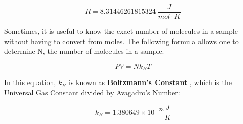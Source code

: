 	\begin{mdframed}[backgroundcolor=green!20!white]
	\begin{equation*}
		R = \SI{8.31446261815324}{\frac{J}{mol\cdot K}}
		\label{constant:universalgas}
	\end{equation*}
\end{mdframed}	


Sometimes, it is useful to know the exact number of molecules in a sample without having to convert from moles.  The following formula allows one to determine N, the number of molecules in a sample.
	
		\begin{mdframed}[backgroundcolor=orange!20!white]
		\begin{equation}
			PV = N k_BT
			\label{equation:universalgaslawkb}
		\end{equation}
	\end{mdframed}

In this equation, $k_B$ is known as \textbf{Boltzmann's Constant}  , which is the Universal Gas Constant divided by Avagadro's Number:


	\begin{mdframed}[backgroundcolor=green!20!white]
	\begin{equation*}
		k_B = 1.380649 \times 10^{-23}\si{\frac{J}{K}}
		\label{constant:boltzman}
	\end{equation*}
\end{mdframed}		
	
